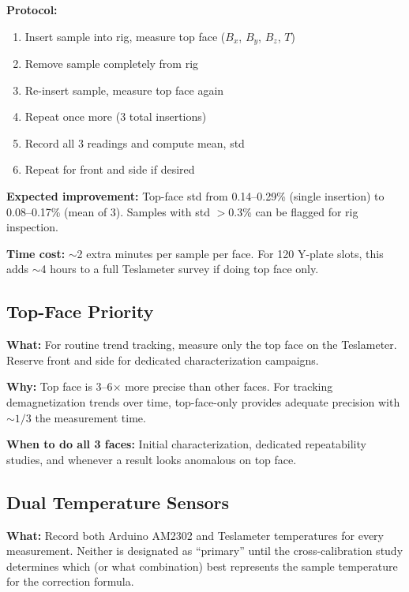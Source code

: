 \documentclass[11pt,letterpaper]{article}
\begin{document}
\textbf{Protocol:}
\begin{enumerate}[nosep]
  \item Insert sample into rig, measure top face ($B_x$, $B_y$, $B_z$, $T$)
  \item Remove sample completely from rig
  \item Re-insert sample, measure top face again
  \item Repeat once more (3 total insertions)
  \item Record all 3 readings and compute mean, std
  \item Repeat for front and side if desired
\end{enumerate}

\textbf{Expected improvement:} Top-face std from 0.14--0.29\% (single insertion)
to 0.08--0.17\% (mean of 3). Samples with std $>$0.3\% can be flagged for rig
inspection.

\textbf{Time cost:} ${\sim}$2 extra minutes per sample per face. For 120
Y-plate slots, this adds ${\sim}$4 hours to a full Teslameter survey if doing
top face only.


\subsection{Top-Face Priority}
\label{sec:imp-topface}

\textbf{What:} For routine trend tracking, measure only the top face on the
Teslameter. Reserve front and side for dedicated characterization campaigns.

\textbf{Why:} Top face is 3--6$\times$ more precise than other faces. For
tracking demagnetization trends over time, top-face-only provides adequate
precision with ${\sim}1/3$ the measurement time.

\textbf{When to do all 3 faces:} Initial characterization, dedicated
repeatability studies, and whenever a result looks anomalous on top face.


\subsection{Dual Temperature Sensors}
\label{sec:imp-dualtemp}

\textbf{What:} Record both Arduino AM2302 and Teslameter temperatures for every
measurement. Neither is designated as ``primary'' until the cross-calibration
study determines which (or what combination) best represents the sample
temperature for the correction formula.
\end{document}
